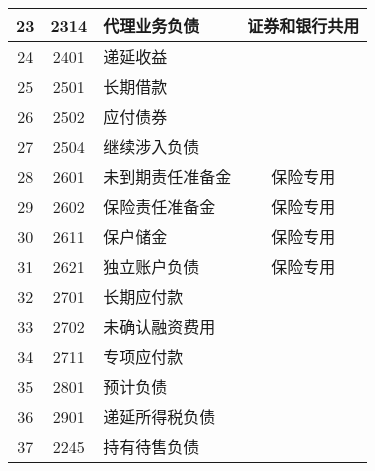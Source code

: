 \documentclass[a4paper]{ctexart}    %
\begin{document}
\begin{center}
\begin{longtable}{|c|c|p{6cm}|c|}
23 & 2314 & 代理业务负债 & 证券和银行共用 \\\hline
24 & 2401 & 递延收益 & \\\hline
25 & 2501 & 长期借款 & \\\hline
26 & 2502 & 应付债券 & \\\hline
27 & 2504 & 继续涉入负债 & \\\hline
28 & 2601 & 未到期责任准备金 & 保险专用 \\\hline
29 & 2602 & 保险责任准备金 &  保险专用 \\\hline
30 & 2611 & 保户储金 & 保险专用 \\\hline
31 & 2621 & 独立账户负债 & 保险专用 \\\hline
32 & 2701 & 长期应付款 & \\\hline
33 & 2702 & 未确认融资费用 & \\\hline
34 & 2711 & 专项应付款 & \\\hline
35 & 2801 & 预计负债 & \\\hline
36 & 2901 & 递延所得税负债 & \\\hline
37 & 2245 & 持有待售负债 & \\\hline
\end{longtable}
\end{center}
\end{document}
